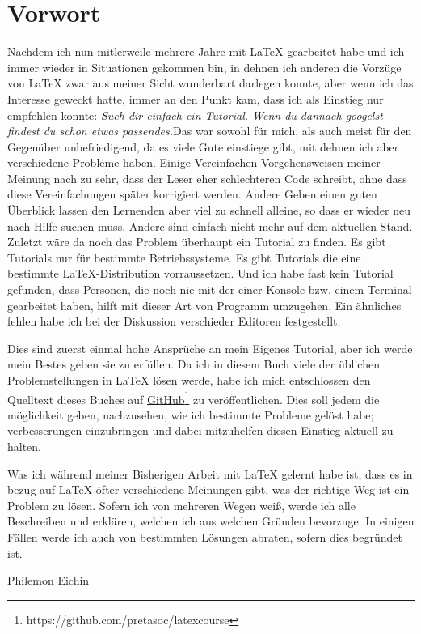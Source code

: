 \chapter{Vorwort}
    Nachdem ich nun mitlerweile mehrere Jahre mit \LaTeX{} gearbeitet habe und ich immer wieder in Situationen gekommen bin, in dehnen ich anderen die Vorzüge von \LaTeX{} zwar aus meiner Sicht wunderbart darlegen konnte, aber wenn ich das Interesse geweckt hatte, immer an den Punkt kam, dass ich als Einstieg nur empfehlen konnte: \glqq \textit{Such dir einfach ein Tutorial. Wenn du dannach googelst findest du schon etwas passendes.}\grqq Das war sowohl für mich, als auch meist für den Gegenüber unbefriedigend, da es viele Gute einstiege gibt, mit dehnen ich aber verschiedene Probleme haben. Einige Vereinfachen Vorgehensweisen meiner Meinung nach zu sehr, dass der Leser eher schlechteren Code schreibt, ohne dass diese Vereinfachungen später korrigiert werden. Andere Geben einen guten Überblick lassen den Lernenden aber viel zu schnell alleine, so dass er wieder neu nach Hilfe suchen muss. Andere sind einfach nicht mehr auf dem aktuellen Stand. Zuletzt wäre da noch das Problem überhaupt ein Tutorial zu finden. Es gibt Tutorials nur für bestimmte Betriebssysteme. Es gibt Tutorials die eine bestimmte \LaTeX{}-Distribution vorraussetzen. Und ich habe fast kein Tutorial gefunden, dass Personen, die noch nie mit der einer Konsole bzw. einem Terminal gearbeitet haben, hilft mit dieser Art von Programm umzugehen. Ein ähnliches fehlen habe ich bei der Diskussion verschieder Editoren festgestellt.
    
        Dies sind zuerst einmal hohe Ansprüche an mein Eigenes Tutorial, aber ich werde mein Bestes geben sie zu erfüllen. Da ich in diesem Buch viele der \glqq üblichen\grqq{} Problemstellungen in \LaTeX{} lösen werde, habe ich mich entschlossen den Quelltext dieses Buches auf \href{https://github.com/pretasoc/latexcourse}{GitHub\footnote{\href{https://github.com/pretasoc/latexcourse}{https://github.com/pretasoc/latexcourse}}} zu veröffentlichen. Dies soll jedem die möglichkeit geben, nachzusehen, wie ich bestimmte Probleme gelöst habe; verbesserungen einzubringen und dabei mitzuhelfen diesen Einstieg aktuell zu halten.

            Was ich während meiner Bisherigen Arbeit mit \LaTeX{} gelernt habe ist, dass es in bezug auf \LaTeX{} öfter verschiedene Meinungen gibt, was der \glqq{}richtige\grqq{} Weg ist ein Problem zu lösen. Sofern ich von mehreren Wegen weiß, werde ich alle Beschreiben und erklären, welchen ich aus welchen Gründen bevorzuge. In einigen Fällen werde ich auch von bestimmten Lösungen abraten, sofern dies begründet ist.

            Philemon Eichin